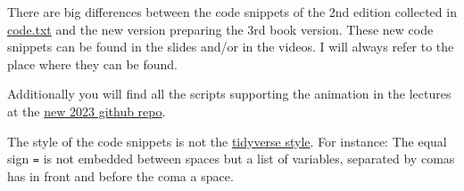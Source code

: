 \documentclass[
  letterpaper,
  DIV=11,
  numbers=noendperiod]{scrreprt}
\begin{document}
\begin{tcolorbox}[enhanced jigsaw, colframe=quarto-callout-caution-color-frame, colback=white, toprule=.15mm, breakable, arc=.35mm, bottomtitle=1mm, colbacktitle=quarto-callout-caution-color!10!white, toptitle=1mm, titlerule=0mm, title=\textcolor{quarto-callout-caution-color}{\faFire}\hspace{0.5em}{Caution}, leftrule=.75mm, opacityback=0, rightrule=.15mm, opacitybacktitle=0.6, bottomrule=.15mm, left=2mm, coltitle=black]

There are big differences between the code snippets of the 2nd edition
collected in \href{http://xcelab.net/rmpubs/sr2/code.txt}{code.txt} and
the new version preparing the 3rd book version. These new code snippets
can be found in the slides and/or in the videos. I will always refer to
the place where they can be found.

Additionally you will find all the scripts supporting the animation in
the lectures at the
\href{https://github.com/rmcelreath/stat_rethinking_2023}{new 2023
github repo}.

\end{tcolorbox}

The style of the code snippets is not the
\href{https://style.tidyverse.org/index.html}{tidyverse style}. For
instance: The equal sign \texttt{=} is not embedded between spaces but a
list of variables, separated by comas has in front and before the coma a
space.
\end{document}
